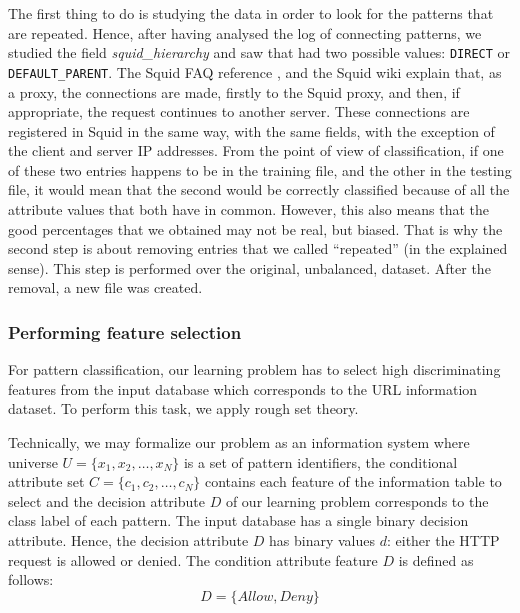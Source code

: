 \documentclass{llncs}
\begin{document}
The first thing to do is studying the data in order to look for the patterns that are repeated. Hence, after having analysed the log of connecting patterns, we studied the field \textit{squid\_hierarchy} and saw that had two possible values: \texttt{DIRECT} or \texttt{DEFAULT\_PARENT}. The Squid FAQ reference \cite{squid_logs}, and the Squid wiki \cite{squid_wiki} explain that, as a proxy, the connections are made, firstly to the Squid proxy, and then, if appropriate, the request continues to another server. These connections are registered in Squid in the same way, with the same fields, with the exception of the client and server IP addresses. From the point of view of classification, if one of these two entries happens to be in the training file, and the other in the testing file, it would mean that the second would be correctly classified because of all the attribute values that both have in common. However, this also means that the good percentages that we obtained may not be real, but biased. That is why the second step is about removing entries that we called ``repeated'' (in the explained sense). This step is performed over the original, unbalanced, dataset. After the removal, a new file was created.

%
\subsubsection{Performing feature selection}
\label{subsec:featselresults}

For pattern classification, our learning problem has to select high discriminating features from the input database which corresponds to the URL information dataset. To perform this task, we apply rough set theory.

Technically, we may formalize our problem as an information system where universe $U = \{x_1, x_2, \ldots, x_N\}$ is a set of pattern identifiers, the conditional attribute set $C =\{c_1,c_2, \ldots, c_N\}$ contains each feature of the information table to select and the decision attribute $D$ of our learning problem corresponds to the class label of each pattern. The input database has a single binary decision attribute. Hence, the decision attribute $D$  has binary values $d$:  either the HTTP request is allowed or denied. The condition attribute feature $D$ is defined as follows:
\begin{displaymath}
D =\{Allow, Deny\}
\end{displaymath}
\end{document}
